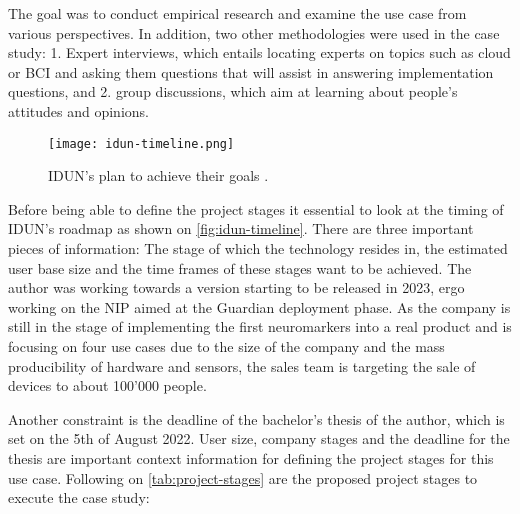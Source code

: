 The goal was to conduct empirical research and examine the use case from various perspectives. In addition, two other methodologies were used in the case study: 1. Expert interviews, which entails locating experts on topics such as cloud or BCI and asking them questions that will assist in answering implementation questions, and 2. group discussions, which aim at learning about people's attitudes and opinions.

\begin{figure}[!ht]
  \centering
  \texttt{[image: idun-timeline.png]}
  \caption{IDUN's plan to achieve their goals \citep{idun_guardian_nodate}.}
  \label{fig:idun-timeline}
\end{figure}

Before being able to define the project stages it essential to look at the timing of IDUN's roadmap as shown on \autoref{fig:idun-timeline}. There are three important pieces of information: The stage of which the technology resides in, the estimated user base size and the time frames of these stages want to be achieved. The author was working towards a version starting to be released in 2023, ergo working on the NIP aimed at the Guardian deployment phase. As the company is still in the stage of implementing the first neuromarkers into a real product and is focusing on four use cases due to the size of the company and the mass producibility of hardware and sensors, the sales team is targeting the sale of devices to about 100'000 people.

Another constraint is the deadline of the bachelor's thesis of the author, which is set on the 5th of August 2022. User size, company stages and the deadline for the thesis are important context information for defining the project stages for this use case. Following on \autoref{tab:project-stages} are the proposed project stages to execute the case study:

